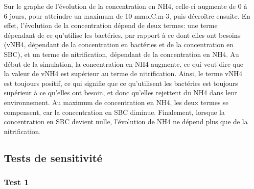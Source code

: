\par{
Sur le graphe de l'\'evolution de la concentration en NH4, celle-ci augmente de 0 \`a 6 jours, pour atteindre
un maximum de 10 mmolC.m-3, puis d\'ecro\^itre ensuite. En effet, l'\'evolution de la concentration d\'epend
de deux termes: une terme d\'ependant de ce qu'utilise les bact\'eries, par rapport \`a ce dont elles ont
besoins (vNH4, d\'ependant de la concentration en bact\'eries et de la concentration en SBC), et un terme
de nitrification, d\'ependant de la concentration en NH4. Au d\'ebut de la simulation, la concentration en
NH4 augmente, ce qui veut dire que la valeur de vNH4 est sup\'erieur au terme de nitrification. Ainsi, le terme
vNH4 est toujours positif, ce qui signifie que ce qu'utilisent les bact\'eries est toujours sup\'erieur \`a ce
qu'elles ont besoin, et donc qu'elles rejettent du NH4 dans leur environnement. Au maximum de concentration
en NH4, les deux termes se compensent, car la concentration en SBC diminue. Finalement, lorsque la
concentration en SBC devient nulle, l'\'evolution de NH4 ne d\'epend plus que de la nitrification.
}

\FloatBarrier
\newpage
\subsection{Tests de sensitivit\'e}
\subsubsection{Test 1}

